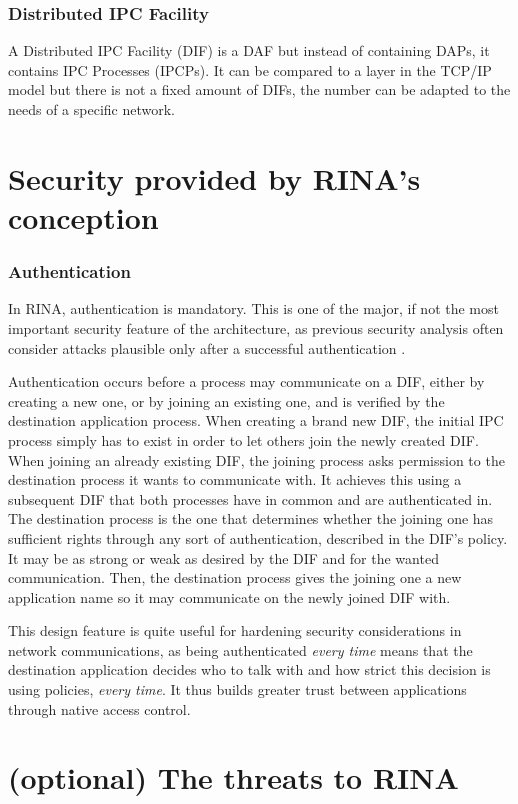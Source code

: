 \documentclass[a4paper]{proc}
\begin{document}
\section{Distributed IPC Facility}
A Distributed IPC Facility (DIF) is a DAF but instead of containing DAPs, it contains IPC Processes (IPCPs).
It can be compared to a layer in the TCP/IP model but there is not a fixed amount of DIFs, the number can be adapted to the needs of a specific network.

\part{Security provided by RINA's conception}
\section{Authentication}

\par In RINA, authentication is mandatory. This is one of the major, if not the
most important security feature of the architecture, as previous security
analysis often consider attacks plausible only after a successful authentication
\cite{assessing-security, wiki, PINS}.

\par Authentication occurs before a process may communicate on a DIF, either by
creating a new one, or by joining an existing one, and is verified by the
destination application process. When creating a brand new DIF, the initial IPC
process simply has to exist in order to let others join the newly created DIF.
When joining an already existing DIF, the joining process asks permission to the
destination process it wants to communicate with. It achieves this using a
subsequent DIF that both processes have in common and are authenticated in.
The destination process is the one that determines whether the joining one has
sufficient rights through any sort of authentication, described in the DIF's
policy. It may be as strong or weak as desired by the DIF and for the wanted
communication. Then, the destination process gives the joining one a new
application name so it may communicate on the newly joined DIF with.

\par This design feature is quite useful for hardening security considerations
in network communications, as being authenticated \textit{every time} means that
the destination application decides who to talk with and how strict this
decision is using policies, \textit{every time}. It thus builds greater trust
between applications through native access control.

\part{(optional) The threats to RINA}

\nocite{*}
\newpage


\end{document}
